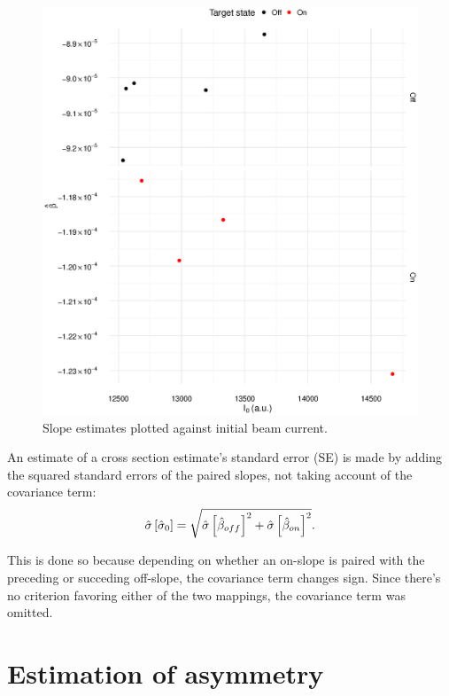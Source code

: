 \documentclass[reprint]{revtex4-1}
\newcommand{\scl}{.4}
\begin{document}
\begin{figure}
\includegraphics[scale=\scl]{img/Slope_VS_IniCurrent.eps}
\caption{Slope estimates plotted against initial beam current.\label{fig:SlpOnI02012}}
\end{figure}


An estimate of a cross section estimate's standard error (SE) is made by adding the squared standard errors of the paired slopes, not taking account of the covariance term:
\begin{equation}
	\SE*{\CS*[0]} = \sqrt{\SE*{\slp*[off]}^2 + \SE*{\slp*[on]}^2}.
\end{equation}

This is done so because depending on whether an on-slope is paired with the preceding or succeding off-slope, the covariance term changes sign. Since there's no criterion favoring either of the two mappings, the covariance term was omitted.

\section{Estimation of asymmetry}
\end{document}
